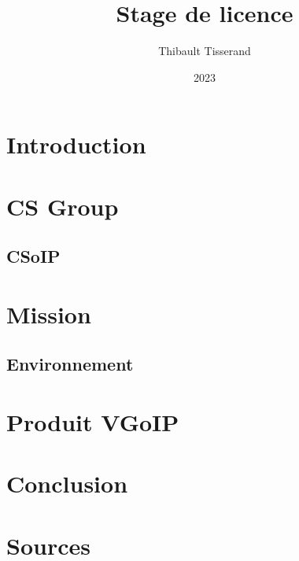 \documentclass{beamer}
\title{Stage de licence}
\author{Thibault Tisserand}
\institute{Université de Lille}
\date{2023}
\begin{document}
\titlepage



\section{Introduction}


\section{CS Group}


\subsection{CSoIP}


\section{Mission}


\subsection{Environnement}


\section{Produit VGoIP}


\section{Conclusion}


\section{Sources}

\end{document}

